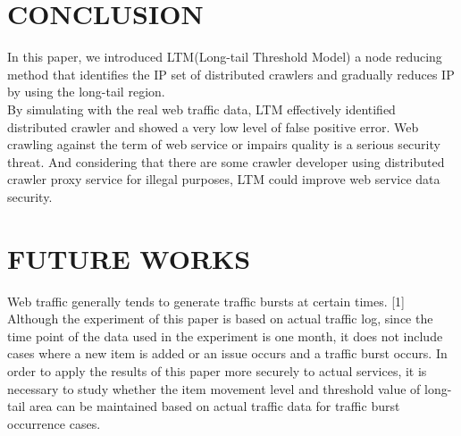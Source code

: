 \documentclass[sigconf,anonymous=true]{acmart}
\begin{document}
%
%
\section{CONCLUSION}
In this paper, we introduced LTM(Long-tail Threshold Model) a node reducing method that identifies the IP set of distributed crawlers and gradually reduces IP by using the long-tail region.\\
By simulating with the real web traffic data, LTM effectively identified distributed crawler and showed a very low level of false positive error.
Web crawling against the term of web service or impairs quality is a serious security threat. And considering that there are some crawler developer using distributed crawler proxy service for illegal purposes, LTM could improve web service data security.


%
%
\section{FUTURE WORKS}
Web traffic generally tends to generate traffic bursts at certain times. [1] Although the experiment of this paper is based on actual traffic log, since the time point of the data used in the experiment is one month, it does not include cases where a new item is added or an issue occurs and a traffic burst occurs.
In order to apply the results of this paper more securely to actual services, it is necessary to study whether the item movement level and threshold value of long-tail area can be maintained based on actual traffic data for traffic burst occurrence cases.




\nocite{*}






%
\end{document}
